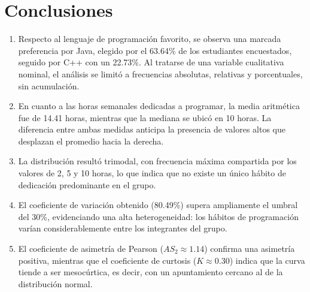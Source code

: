 \documentclass[12pt,letterpaper]{article}
\begin{document}
\section{Conclusiones}

\begin{enumerate}
    \item Respecto al lenguaje de programación favorito, se observa una marcada preferencia por Java, elegido por el 63.64\% de los estudiantes encuestados, seguido por C++ con un 22.73\%. Al tratarse de una variable cualitativa nominal, el análisis se limitó a frecuencias absolutas, relativas y porcentuales, sin acumulación.

    \item En cuanto a las horas semanales dedicadas a programar, la media aritmética fue de 14.41 horas, mientras que la mediana se ubicó en 10 horas. La diferencia entre ambas medidas anticipa la presencia de valores altos que desplazan el promedio hacia la derecha.

    \item La distribución resultó trimodal, con frecuencia máxima compartida por los valores de 2, 5 y 10 horas, lo que indica que no existe un único hábito de dedicación predominante en el grupo.

    \item El coeficiente de variación obtenido (80.49\%) supera ampliamente el umbral del 30\%, evidenciando una alta heterogeneidad: los hábitos de programación varían considerablemente entre los integrantes del grupo.

    \item El coeficiente de asimetría de Pearson ($AS_2 \approx 1.14$) confirma una asimetría positiva, mientras que el coeficiente de curtosis ($K \approx 0.30$) indica que la curva tiende a ser mesocúrtica, es decir, con un apuntamiento cercano al de la distribución normal.

\end{enumerate}

\clearpage

\printbibliography[heading=bibintoc]
\end{document}
